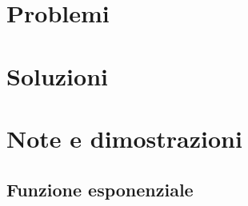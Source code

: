 \documentclass[letterpaper,10pt,italian]{jupyterBook}
\begin{document}
\sphinxstepscope


\section{Problemi}
\label{\detokenize{ch/precalculus/exponential_logarithm-problems:problemi}}\label{\detokenize{ch/precalculus/exponential_logarithm-problems:math-hs-exp-log-problems}}\label{\detokenize{ch/precalculus/exponential_logarithm-problems::doc}}
\sphinxstepscope


\section{Soluzioni}
\label{\detokenize{ch/precalculus/exponential_logarithm-sol:soluzioni}}\label{\detokenize{ch/precalculus/exponential_logarithm-sol:math-hs-exp-log-sol}}\label{\detokenize{ch/precalculus/exponential_logarithm-sol::doc}}
\sphinxstepscope


\section{Note e dimostrazioni}
\label{\detokenize{ch/precalculus/exponential_logarithm-notes:note-e-dimostrazioni}}\label{\detokenize{ch/precalculus/exponential_logarithm-notes:math-hs-exp-log-notes}}\label{\detokenize{ch/precalculus/exponential_logarithm-notes::doc}}

\subsection{Funzione esponenziale}
\label{\detokenize{ch/precalculus/exponential_logarithm-notes:funzione-esponenziale}}\label{\detokenize{ch/precalculus/exponential_logarithm-notes:math-hs-exp-log-notes-exp}}
\end{document}
